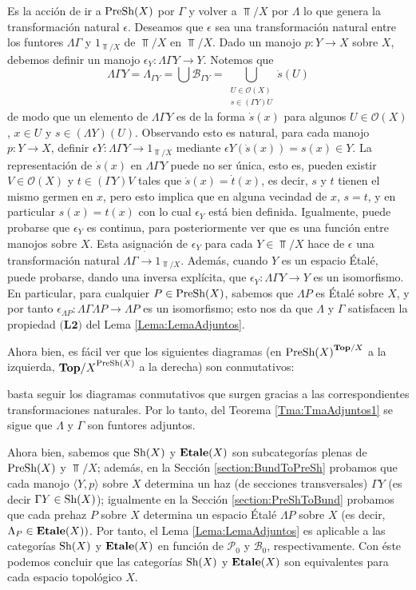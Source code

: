 Es la acción de ir a $\normalfont{\text{PreSh}}(X)$ por $\Gamma$ y volver a $\Top/X$ por $\Lambda$ lo que genera la transformación natural $\epsilon$. Deseamos que $\epsilon$ sea una transformación natural entre los funtores $\Lambda \Gamma$ y $1_{\Top/X}$ de $\Top/X$ en $\Top/X$. Dado un manojo $p:Y\to X$ sobre $X$, debemos definir un manojo $\epsilon_Y:\Lambda \Gamma Y \to Y$. Notemos que
$$
   \Lambda \Gamma Y = \Lambda_{\Gamma Y} = \bigcup \mathcal{B}_{\Gamma Y} = \bigcup_{\substack{U\in\mathcal{O}(X)\\s\in(\Gamma Y)U}}\dot{s}(U)
$$
de modo que un elemento de $\Lambda \Gamma Y$ es de la forma $\dot{s}(x)$ para algunos $U\in\mathcal{O}(X)$, $x\in U$ y $s\in(\Lambda Y)(U)$. Observando esto es natural, para cada manojo $p:Y\to X$, definir $\epsilon Y:\Lambda \Gamma Y\to 1_{\Top/X}$ mediante $\epsilon Y (\dot{s}(x))=s(x)\in Y$. La representación de $\dot{s}(x)$ en $\Lambda \Gamma Y$ puede no ser única, esto es, pueden existir $V\in \mathcal{O}(X)$ y $t\in(\Gamma Y)V$ tales que $\dot{s}(x)=\dot{t}(x)$, es decir, $s$ y $t$ tienen el mismo germen en $x$, pero esto implica que en alguna vecindad de $x$, $s=t$, y en particular $s(x)=t(x)$ con lo cual $\epsilon_{Y}$ está bien definida. Igualmente, puede probarse que $\epsilon_Y$ es continua, para posteriormente ver que es una función entre manojos sobre $X$.  Esta asignación de $\epsilon_{Y}$ para cada $Y\in\Top/X$ hace de $\epsilon$ una transformación natural $\Lambda \Gamma \dot{\to} 1_{\Top/X}$. Además, cuando $Y$ es un espacio Étalé, puede probarse, dando una inversa explícita, que $\epsilon_Y:\Lambda \Gamma Y \to Y$ es un isomorfismo. En particular, para cualquier $P\in \normalfont{\text{PreSh}}(X)$, sabemos que $\Lambda P$ es Étalé sobre $X$, y por tanto $\epsilon_{\Lambda P}:\Lambda \Gamma \Lambda P \to \Lambda P$ es un isomorfismo; esto nos da que $\Lambda$ y $\Gamma$ satisfacen la propiedad $\textbf{(L2)}$ del Lema \ref{Lema:LemaAdjuntos}.

Ahora bien, es fácil ver que los siguientes diagramas (en ${\normalfont{\text{PreSh}}(X)}^{\normalfont{\textbf{Top}}/X}$ a la izquierda, ${\normalfont{\textbf{Top}}/X}^{\normalfont{\text{PreSh}}(X)}$ a la derecha) son conmutativos:

basta seguir los diagramas conmutativos que surgen gracias a las correspondientes transformaciones naturales. Por lo tanto, del  Teorema \ref{Tma:TmaAdjuntos1} se sigue que $\Lambda$ y $\Gamma$ son funtores adjuntos.

Ahora bien, sabemos que $\normalfont{\text{Sh}}(X)$ y $\normalfont{\textbf{Etale}}(X)$ son subcategorías plenas de $\normalfont{\text{PreSh}}(X)$ y $\Top/X$; además, en la Sección \ref{section:BundToPreSh} probamos que cada manojo $\langle Y,p\rangle$ sobre $X$ determina un haz (de secciones transversales) $\Gamma Y$ (es decir $\Gamma Y\in \normalfont{\text{Sh}}(X)$); igualmente en la Sección \ref{section:PreShToBund} probamos que cada prehaz $P$ sobre $X$ determina un espacio Étalé $\Lambda P$ sobre $X$ (es decir, $\Lambda_P\in\normalfont{\textbf{Etale}}(X))$. Por tanto, el Lema \ref{Lema:LemaAdjuntos} es aplicable a las categorías $\normalfont{\text{Sh}}(X)$ y $\normalfont{\textbf{Etale}}(X)$ en función de $\mathcal{P}_0$ y $\mathcal{B}_0$, respectivamente. Con éste podemos concluir que las categorías $\normalfont{\text{Sh}}(X)$ y $\normalfont{\textbf{Etale}}(X)$ son equivalentes para cada espacio topológico $X$. 
